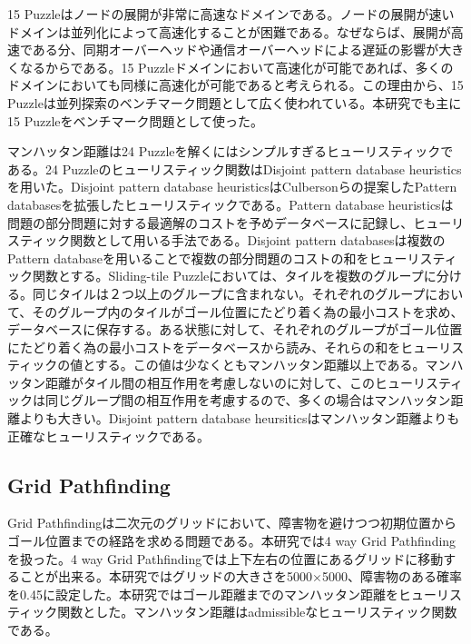 \documentclass{jsarticle}
\renewcommand{\textbf}{} %
\begin{document}
15 Puzzleはノードの展開が非常に高速なドメインである。ノードの展開が速いドメインは並列化によって高速化することが困難である。なぜならば、展開が高速である分、同期オーバーヘッドや通信オーバーヘッドによる遅延の影響が大きくなるからである。15 Puzzleドメインにおいて高速化が可能であれば、多くのドメインにおいても同様に高速化が可能であると考えられる。この理由から、15 Puzzleは並列探索のベンチマーク問題として広く使われている。本研究でも主に15 Puzzleをベンチマーク問題として使った。
\newline

マンハッタン距離は24 Puzzleを解くにはシンプルすぎるヒューリスティックである。24 Puzzleのヒューリスティック関数は\textbf{Disjoint pattern database heuristics}を用いた\cite{Korf2002}。Disjoint pattern database heuristicsはCulbersonらの提案したPattern databasesを拡張したヒューリスティックである。Pattern database heuristicsは問題の部分問題に対する最適解のコストを予めデータベースに記録し、ヒューリスティック関数として用いる手法である\cite{Culberson1998pattern}。Disjoint pattern databasesは複数のPattern databaseを用いることで複数の部分問題のコストの和をヒューリスティック関数とする。Sliding-tile Puzzleにおいては、タイルを複数のグループに分ける。同じタイルは２つ以上のグループに含まれない。それぞれのグループにおいて、そのグループ内のタイルがゴール位置にたどり着く為の最小コストを求め、データベースに保存する。ある状態に対して、それぞれのグループがゴール位置にたどり着く為の最小コストをデータベースから読み、それらの和をヒューリスティックの値とする。この値は少なくともマンハッタン距離以上である。マンハッタン距離がタイル間の相互作用を考慮しないのに対して、このヒューリスティックは同じグループ間の相互作用を考慮するので、多くの場合はマンハッタン距離よりも大きい。Disjoint pattern database heursiticsはマンハッタン距離よりも正確なヒューリスティックである。


\subsection{Grid Pathfinding}

Grid Pathfindingは二次元のグリッドにおいて、障害物を避けつつ初期位置からゴール位置までの経路を求める問題である。本研究では4 way Grid Pathfindingを扱った。4 way Grid Pathfindingでは上下左右の位置にあるグリッドに移動することが出来る。本研究ではグリッドの大きさを5000$\times$5000、障害物のある確率を0.45に設定した。本研究ではゴール距離までのマンハッタン距離をヒューリスティック関数とした。マンハッタン距離はadmissibleなヒューリスティック関数である。
\end{document}
